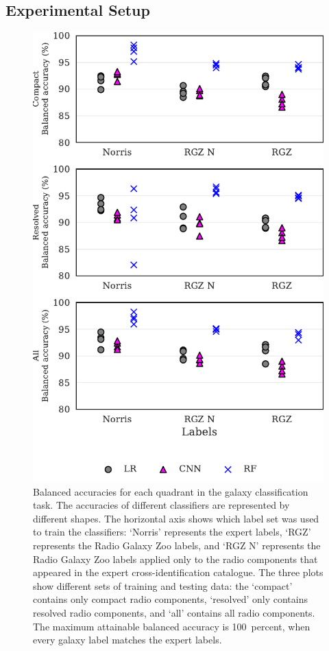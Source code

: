 \documentclass[fleqn,usenatbib,usedcolumn]{mnras}
\begin{document}
  \subsection{Experimental Setup}
  \label{sec:experimental-setup}

  \begin{figure}
  \centering
  \includegraphics[width=\columnwidth]{images/cdfs_ba_grid.pdf}
  \caption{Balanced accuracies for each quadrant in the galaxy
    classification task. The accuracies of different classifiers are represented
    by different shapes. The horizontal axis shows which label set was used to
    train the classifiers: `Norris' represents the expert labels, `RGZ'
    represents the Radio Galaxy Zoo labels, and `RGZ N' represents the Radio
    Galaxy Zoo labels applied only to the radio components that appeared in the
    expert cross-identification catalogue. The three plots show different sets
    of training and testing data: the `compact' contains only compact radio
    components, `resolved' only contains resolved radio components, and `all'
    contains all radio components. The maximum attainable balanced accuracy is
    100~percent, when every galaxy label matches the expert labels.
    \label{fig:ba}}
  \end{figure}
\end{document}
